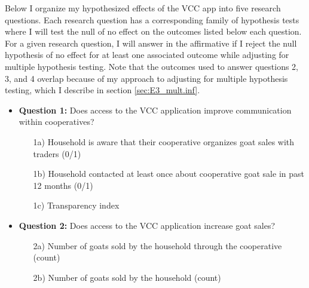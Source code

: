 \documentclass[11pt]{article}
\begin{document}
Below I organize my hypothesized effects of the VCC app into five research questions. Each research question has a corresponding family of hypothesis tests where I will test the null of no effect on the outcomes listed below each question. For a given research question, I will answer in the affirmative if I reject the null hypothesis of no effect for at least one associated outcome while adjusting for multiple hypothesis testing. Note that the outcomes used to answer questions 2, 3, and 4 overlap because of my approach to adjusting for multiple hypothesis testing, which I describe in section \ref{sec:E3_mult.inf}. 

\singlespacing
\begin{itemize}
    \item \textbf{Question 1:} Does access to the VCC application improve communication within cooperatives?
        \begin{enumerate}
            \item[1a)] Household is aware that their cooperative organizes goat sales with traders (0/1)
            \item[1b)] Household contacted at least once about cooperative goat sale in past 12 months (0/1)
            \item[1c)] Transparency index
        \end{enumerate}
    
    \item \textbf{Question 2:} Does access to the VCC application increase goat sales?
        \begin{enumerate}
            \item[2a)] Number of goats sold by the household through the cooperative (count)
            \item[2b)] Number of goats sold by the household (count)
        \end{enumerate}
    

\end{itemize}
\end{document}
